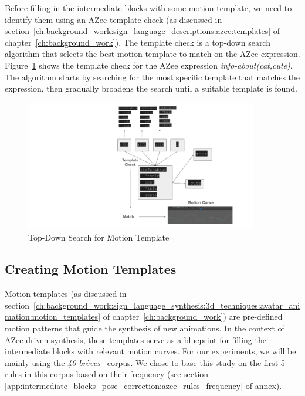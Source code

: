 \documentclass[../../main.tex]{subfiles}
\begin{document}
Before filling in the intermediate blocks with some motion template, we need to identify them using an AZee template check (as discussed in section~\ref{ch:background_work:sign_language_descriptions:azee:templates} of chapter~\ref{ch:background_work}). The template check is a top-down search algorithm that selects the best motion template to match on the AZee expression. Figure~\ref{fig:top_down_search_template} shows the template check for the AZee expression \emph{info-about(cat,cute)}. The algorithm starts by searching for the most specific template that matches the expression, then gradually broadens the search until a suitable template is found.

\begin{figure}
    \centering \includegraphics[width = 4in]{chapters/intermediate_blocks_pose_correction/images/top_down_search_template.png}
    \caption{Top-Down Search for Motion Template}
    \label{fig:top_down_search_template}
\end{figure}

\subsection{Creating Motion Templates}
\label{ch:intermediate_blocks_pose_correction:creating_motion_templates}

Motion templates (as discussed in section~\ref{ch:background_work:sign_language_synthesis:3d_techniques:avatar_animation:motion_templates} of chapter~\ref{ch:background_work}) are pre-defined motion patterns that guide the synthesis of new animations. In the context of AZee-driven synthesis, these templates serve as a blueprint for filling the intermediate blocks with relevant motion curves. For our experiments, we will be mainly using the \emph{40 brèves}~\cite{challant2022first} corpus. We chose to base this study on the first 5 rules in this corpus based on their frequency (see section  \ref{app:intermediate_blocks_pose_correction:azee_rules_frequency} of annex).
\end{document}
